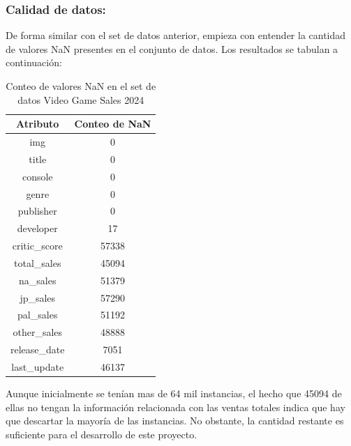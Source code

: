 \documentclass[a4paper]{article}
\begin{document}
\subsubsection{Calidad de datos:}
De forma similar con el set de datos anterior, empieza con entender la cantidad de valores NaN presentes en el conjunto de datos. Los resultados se tabulan a continuación:
    
    \begin{table}[hbtp!]
        \centering
        \begin{tabular}{|c|c|}
            \hline
            \textbf{Atributo} & \textbf{Conteo de NaN}\\
            \hline
            img & 0\\
            \hline
            title & 0\\
            \hline
            console & 0\\
            \hline
            genre & 0\\
            \hline
            publisher & 0\\
            \hline
            developer & 17\\
            \hline
            critic\_score & 57338\\
            \hline
            total\_sales & 45094\\
            \hline
            na\_sales & 51379\\
            \hline
            jp\_sales & 57290\\
            \hline
            pal\_sales & 51192\\
            \hline
            other\_sales & 48888\\
            \hline
            release\_date & 7051\\
            \hline
            last\_update & 46137\\
            \hline
        \end{tabular}
        \caption{Conteo de valores NaN en el set de datos Video Game Sales 2024}
        \label{tab:conteo_nan_info_videojuegos_ventas}
    \end{table}

    Aunque inicialmente se tenían mas de 64 mil instancias, el hecho que 45094 de ellas no tengan la información relacionada con las ventas totales indica que hay que descartar la mayoría de las instancias. No obstante, la cantidad restante es suficiente para el desarrollo de este proyecto.
\end{document}

